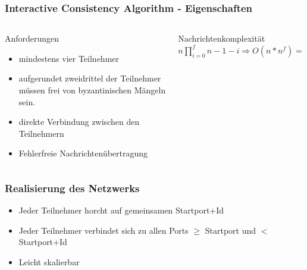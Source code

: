 \documentclass[aspectratio=169]{beamer}
\begin{document}
\begin{frame}
    \frametitle{Interactive Consistency Algorithm - Eigenschaften} 
    \begin{columns}
    \begin{column}{0.5\textwidth}
    \begin{alertblock}
        {Anforderungen}
    \begin{itemize}
        \item mindestens vier Teilnehmer
        \item aufgerundet zweidrittel der Teilnehmer müssen frei von byzantinischen Mängeln sein.
        \item direkte Verbindung zwischen den Teilnehmern
        \item Fehlerfreie Nachrichtenübertragung
    \end{itemize}
    \end{alertblock}
    \end{column}
    \begin{column}{0.5\textwidth}
    \begin{alertblock}
        {Nachrichtenkomplexität}
         $n\prod_{i=0}^f n-1-i \Rightarrow O(n*n^f) = O(n^{f+1})$
    \end{alertblock}
    \end{column}
    \end{columns}
\end{frame}

\begin{frame}
    \frametitle{Realisierung des Netzwerks}
\begin{center}
\end{center}
\begin{itemize}
    \item Jeder Teilnehmer horcht auf gemeinsamen Startport+Id
    \item Jeder Teilnehmer verbindet sich zu allen Ports $\geq$ Startport und $<$ Startport+Id
    \item Leicht skalierbar
\end{itemize}
\end{frame}
\end{document}
